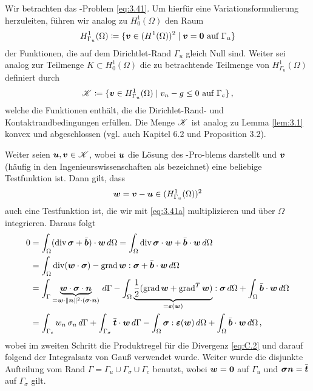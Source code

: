 Wir betrachten das -Problem \eqref{eq:3.41}. Um hierfür eine Variationsformulierung herzuleiten, führen wir analog zu $H^1_0(\Omega)$ den Raum
\begin{align}\label{eq:3.43}
	H^1_{\Gamma_u}(\Omega) \coloneqq \{\boldsymbol v \in (H^1(\Omega))^2 \mid \boldsymbol v = \boldsymbol 0 \text{ auf } \Gamma_u\}
\end{align}
der Funktionen, die auf dem  Dirichtlet-Rand $\Gamma_u$ gleich Null sind. Weiter sei analog zur Teilmenge $K \subset H^1_0(\Omega)$ die zu betrachtende Teilmenge von $H^1_{\Gamma_u}(\Omega)$ definiert durch
\begin{align}\label{eq:3.44}
	\mathscr K \coloneqq \{\boldsymbol v \in H^1_{\Gamma_u}(\Omega) \mid v_n - g \le 0 \text{ auf } \Gamma_c\} \, ,
\end{align}
welche die Funktionen enthält, die die Dirichlet-Rand- und Kontaktrandbedingungen erfüllen. Die Menge $\mathscr K$ ist analog zu Lemma \ref{lem:3.1} konvex und abgeschlossen (vgl. auch \cite{KikOden} Kapitel 6.2 und \cite{CarWri} Proposition 3.2).


Weiter seien $\boldsymbol u, \boldsymbol v \in \mathscr K$, wobei $\boldsymbol u$ die Lösung des -Pro-blems darstellt und $\boldsymbol v$ (häufig in den Ingenieurswissenschaften als \textit{} bezeichnet) eine beliebige Testfunktion ist. Dann gilt, dass 
\[
	\boldsymbol w = \boldsymbol v - \boldsymbol u \in (H^1_{\Gamma_u}(\Omega))^2
\]
auch eine Testfunktion ist, die wir mit \eqref{eq:3.41a} multiplizieren und über $\Omega$ integrieren. Daraus folgt
\begin{align}\notag
	 0 & =  \int_\Omega (\operatorname{div} \boldsymbol\sigma + \bar{\boldsymbol b}) \cdot \boldsymbol w \, d \Omega = \int_\Omega \operatorname{div} \boldsymbol \sigma \cdot \boldsymbol w + \bar{\boldsymbol b} \cdot \boldsymbol w \, d\Omega \\
	 \notag
	& = \int_\Omega \operatorname{div}(\boldsymbol w \cdot \boldsymbol\sigma) - \operatorname{grad} \boldsymbol w : \boldsymbol \sigma + \bar{\boldsymbol b} \cdot \boldsymbol w \, d\Omega \\
	\notag
	& = \int_\Gamma \underbrace{\boldsymbol w \cdot \boldsymbol \sigma \cdot \boldsymbol n}_{=\boldsymbol w \cdot \lVert \boldsymbol n\rVert^2 \cdot (\boldsymbol \sigma \cdot \boldsymbol n)} \, d\Gamma - \int_\Omega \underbrace{\frac 1 2 (\operatorname{grad} \boldsymbol w + \operatorname{grad}^T \boldsymbol w)}_{= \boldsymbol {\varepsilon} (\boldsymbol w)} : \boldsymbol \sigma \, d\Omega + \int_\Omega \bar{\boldsymbol b} \cdot \boldsymbol w \, d \Omega \\
	\label{eq:3.43}
	& = \int_{\Gamma_c} w_n \, \sigma_n \, d \Gamma + \int_{\Gamma_\sigma} \bar{\boldsymbol t} \cdot \boldsymbol w \, d\Gamma-\int_\Omega \boldsymbol\sigma: \boldsymbol {\varepsilon}(\boldsymbol w) \, d\Omega + \int_\Omega \bar{\boldsymbol b} \cdot \boldsymbol w \, d\Omega \, ,
\end{align}
wobei im zweiten Schritt die Produktregel für die Divergenz \eqref{eq:C.2} und darauf folgend der Integralsatz von Gauß verwendet wurde. Weiter wurde die disjunkte Aufteilung vom Rand $\Gamma = \Gamma_u \cup \Gamma_\sigma \cup \Gamma_c$ benutzt, wobei $\boldsymbol w = \boldsymbol 0$ auf $\Gamma_u$ und $\boldsymbol \sigma \boldsymbol n = \bar{\boldsymbol t}$ auf $\Gamma_\sigma$ gilt.


